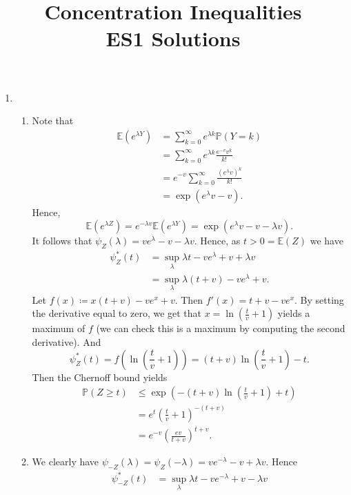 \documentclass{article}
\theoremstyle{definition}
\theoremstyle{plain}
\theoremstyle{definition}
\begin{document}
	\title{Concentration Inequalities\\ ES1 Solutions}
	\date{}
	\maketitle
	\begin{enumerate}[wide, labelwidth=!, labelindent=0pt]
		\item \leavevmode \begin{enumerate}
			\item Note that 
			\begin{align*}
				\mathbb{E}(e^{\lambda Y}) &= \sum_{k=0}^\infty e^{\lambda k}\mathbb{P}(Y=k)\\
				&= \sum_{k=0}^\infty e^{\lambda k}\frac{e^{-v}v^k}{k!}\\
				&= e^{-v}\sum_{k=0}^\infty \frac{(e^{\lambda} v)^k}{k!}\\
				&= \exp(e^\lambda v - v).
			\end{align*}
			Hence,
			\[
				\mathbb{E}(e^{\lambda Z}) = e^{-\lambda v}\mathbb{E}(e^{\lambda Y}) = \exp(e^{\lambda}v - v - \lambda v).
			\]
			It follows that $\psi_Z(\lambda) = ve^{\lambda} - v - \lambda v$. Hence, as $t>0 = \mathbb{E}(Z)$ we have
			\begin{align*}
				\psi_Z^*(t) &= \sup_{\lambda} \lambda t - ve^{\lambda} + v + \lambda v\\
				&= \sup_{\lambda} \lambda(t+ v) -ve^{\lambda} + v.
			\end{align*}
			Let $f(x)\coloneqq x(t+v) -ve^{x} + v$. Then $f'(x) = t+v -ve^{x}$. By setting the derivative equal to zero, we get that $x = \ln(\frac{t}{v} + 1)$ yields a maximum of $f$ (we can check this is a maximum by computing the second derivative). And
			\[
				\psi_Z^*(t) = f\left(\ln\left(\frac{t}{v} + 1\right)\right) = (t + v)\ln\left(\frac{t}{v} + 1\right) -t.
			\]
			Then the Chernoff bound yields 
			\begin{align*}
			\mathbb{P}(Z\geq t) &\leq \exp\left(-(t + v)\ln\left(\frac{t}{v} + 1\right) +t\right)\\
			 &= e^t\left(\frac{t}{v} + 1\right)^{-(t+v)}\\
			 &= e^{-v}\left(\frac{ev}{t+v}\right)^{t+v}.
			\end{align*}
			\item We clearly have $\psi_{-Z}(\lambda) = \psi_Z(-\lambda) = ve^{-\lambda} - v + \lambda v$. Hence
			\begin{align*}
				\psi^*_{-Z}(t) &= \sup_{\lambda }\lambda t -ve^{-\lambda} + v - \lambda v\\

\end{align*}
\end{enumerate}
\end{enumerate}
\end{document}
